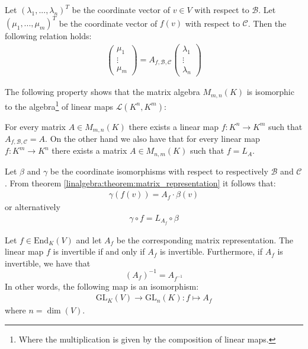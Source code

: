         \begin{property}\label{linalgebra:theorem:matrix_representation}
		Let $(\lambda_1, ..., \lambda_n)^T$ be the coordinate vector of $v\in V$ with respect to $\mathcal{B}$. Let $(\mu_1, ..., \mu_m)^T$ be the coordinate vector of $f(v)$ with respect to $\mathcal{C}$. Then the following relation holds:
            	\begin{gather}
			\left(
			\begin{array}{c}
				\mu_1\\
				\vdots\\
				\mu_m
			\end{array}\right)
	                = A_{f, \mathcal{B}, \mathcal{C}}
        	        \left(\begin{array}{c}
				\lambda_1\\
				\vdots\\
				\lambda_n
			\end{array}\right)
		\end{gather}
	\end{property}

        The following property shows that the matrix algebra $M_{m, n}(K)$ is isomorphic to the algebra\footnote{Where the multiplication is given by the composition of linear maps.} of linear maps $\mathcal{L}(K^n, K^m)$:
        \begin{property}\label{linalgebra:theorem:map_matrix_link}
		For every matrix $A\in M_{m,n}(K)$ there exists a linear map $f:K^n\rightarrow K^m$ such that $A_{f, \mathcal{B}, \mathcal{C}} = A$. On the other hand we also have that for every linear map $f:K^m\rightarrow K^n$ there exists a matrix $A\in M_{n,m}(K)$ such that $f=L_A$.
	\end{property}
        \begin{property}
		Let $\beta$ and $\gamma$ be the coordinate isomorphisms with respect to respectively $\mathcal{B}$ and $\mathcal{C}$. From theorem \ref{linalgebra:theorem:matrix_representation} it follows that:
        	\begin{gather}
			\gamma(f(v)) = A_f\cdot\beta(v)
		\end{gather}
        	or alternatively
        	\begin{gather}
			\gamma\circ f = L_{A_f}\circ\beta
		\end{gather}
	\end{property}

        \begin{result}\label{linalgebra:matrix_invertible_map}
	        Let $f\in\text{End}_K(V)$ and let $A_f$ be the corresponding matrix representation. The linear map $f$ is invertible if and only if $A_f$ is invertible. Furthermore, if $A_f$ is invertible, we have that \[\left(A_f\right)^{-1} = A_{f^{-1}}\] In other words, the following map is an isomorphism:
	        \begin{gather}
	        	\text{GL}_K(V)\rightarrow\text{GL}_n(K):f\mapsto A_f
	        \end{gather}
	        where $n=\dim(V)$.
	\end{result}

